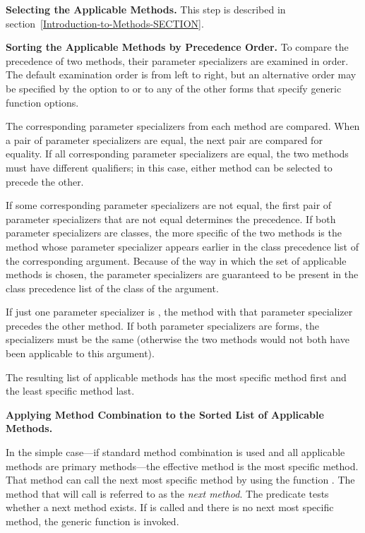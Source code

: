 \textbf{Selecting the Applicable Methods.}
This step is described in section~\ref{Introduction-to-Methods-SECTION}.

\textbf{Sorting the Applicable Methods by Precedence Order.}
To compare the precedence of two methods, their parameter specializers
are examined in order.  The default examination order is from left to
right, but an alternative order may be specified by the 
 option to  or to any of
the other forms that specify generic function options.

The corresponding parameter specializers from each method are
compared.  When a pair of parameter specializers are equal, the next
pair are compared for equality.  If all corresponding parameter
specializers are equal, the two methods must have different
qualifiers; in this case, either method can be selected to precede the
other.

If some corresponding parameter specializers are not equal, the first
pair of parameter specializers that are not equal determines the
precedence.  If both parameter specializers are classes, the more
specific of the two methods is the method whose parameter specializer
appears earlier in the class precedence list of the corresponding
argument.  Because of the way in which the set of applicable methods
is chosen, the parameter specializers are guaranteed to be present in
the class precedence list of the class of the argument.

If just one parameter specializer is , the
method with that parameter specializer precedes the 
other method.  If both parameter specializers are 
forms, the
specializers must be the same (otherwise the two methods would
not both have been applicable to this argument).

The resulting list of applicable methods has the most specific
method first and the least specific method last.    

\textbf{Applying Method Combination to the Sorted List of Applicable Methods.}

In the simple case---if standard method combination is used and all
applicable methods are primary methods---the effective method is the
most specific method.  That method can call the next most specific
method by using the function .  The method that
 will call is referred to as the \emph{next
method}.  The predicate  tests whether a next
method exists.  If  is called and there is no
next most specific method, the generic function 
is invoked.

